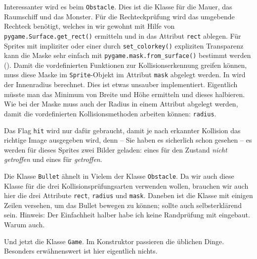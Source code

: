 Interessanter wird es beim \texttt{Obstacle}. Dies ist die Klasse für die Mauer, das Raumschiff und das Monster. Für die Rechteckprüfung wird das umgebende Rechteck benötigt, welches in  wir gewohnt mit Hilfe von \texttt{pygame.Surface.get\_rect()} ermitteln und in das Attribut \texttt{rect} ablegen. Für Sprites mit impliziter oder einer durch \texttt{set\_colorkey()} expliziten Transparenz kann die Maske sehr einfach mit \texttt{pygame.\-mask.\-from\_surface()} bestimmt werden (). Damit die vordefinierten Funktionen zur Kollisionserkennung greifen können, muss diese Maske im \texttt{Sprite}-Objekt im Attribut \texttt{mask} abgelegt werden. In  wird der Innenradius berechnet. Dies ist etwas unsauber implementiert. Eigentlich müsste man das Minimum von Breite und Höhe ermitteln und dieses halbieren. Wie bei der Maske muss auch der Radius in einem Attribut abgelegt werden, damit die vordefinierten Kollisionsmethoden arbeiten können: \texttt{radius}. 

Das Flag \texttt{hit} wird nur dafür gebraucht, damit je nach erkannter Kollision das richtige Image ausgegeben wird, denn -- Sie haben es sicherlich schon gesehen -- es werden für dieses Sprites zwei Bilder geladen: eines für den Zustand \emph{nicht getroffen} und eines für \emph{getroffen}.


Die Klasse \texttt{Bullet} ähnelt in Vielem der Klasse \texttt{Obstacle}. Da wir auch diese Klasse für die drei Kollisionsprüfungsarten verwenden wollen, brauchen wir auch hier die drei Attribute \texttt{rect}, \texttt{radius} und \texttt{mask}. Daneben ist die Klasse mit einigen Zeilen versehen, um das Bullet bewegen zu können; sollte auch selbsterklärend sein. Hinweis: Der Einfachheit halber habe ich keine Randprüfung mit eingebaut. Warum auch.


Und jetzt die Klasse \texttt{Game}. Im Konstruktor passieren die üblichen Dinge. Besonders erwähnenswert ist hier eigentlich nichts.

